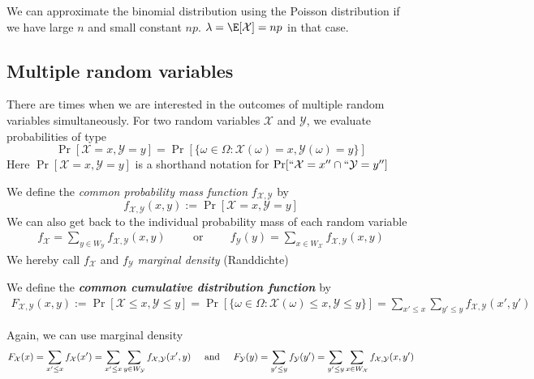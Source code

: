 We can approximate the binomial distribution using the Poisson distribution if we have large $n$ and small constant $np$. $\lambda = \E[\mathcal{X}] = np$ in that case.



\newpage
\subsection{Multiple random variables}
There are times when we are interested in the outcomes of multiple random variables simultaneously. For two random variables $\mathcal{X}$ and $\mathcal{Y}$, we evaluate probabilities of type
\[
    \Pr[\mathcal{X} = x, \mathcal{Y} = y] = \Pr[\{ \omega \in \Omega : \mathcal{X}(\omega) = x, \mathcal{Y}(\omega) = y \}]
\]
Here $\Pr[\mathcal{X} = x, \mathcal{Y} = y]$ is a shorthand notation for $\Pr[``\mathcal{X} = x'' \cap ``\mathcal{Y} = y'']$

We define the \textit{common probability mass function} $f_{\mathcal{X}, \mathcal{Y}}$ by
\[
    f_{\mathcal{X}, \mathcal{Y}}(x, y) := \Pr[\mathcal{X} = x, \mathcal{Y} = y]
\]
We can also get back to the individual probability mass of each random variable
\begin{align*}
    f_{\mathcal{X}} = \sum_{y \in W_{\mathcal{Y}}} f_{\mathcal{X}, \mathcal{Y}}(x, y) \hspace{1cm} \text{or} \hspace{1cm} f_{\mathcal{Y}}(y) = \sum_{x \in W_{\mathcal{X}}} f_{\mathcal{X}, \mathcal{Y}}(x, y)
\end{align*}
We hereby call $f_{\mathcal{X}}$ and $f_{\mathcal{Y}}$ \textit{marginal density} (Randdichte)

We define the \textbf{\textit{common cumulative distribution function}} by
\begin{align*}
    F_{\mathcal{X}, \mathcal{Y}}(x, y) := \Pr[\mathcal{X} \leq x, \mathcal{Y} \leq y] = \Pr[\{ \omega \in \Omega : \mathcal{X}(\omega) \leq x, \mathcal{Y} \leq y \}] = \sum_{x' \leq x} \sum_{y' \leq y} f_{\mathcal{X}, \mathcal{Y}}(x', y')
\end{align*}

Again, we can use marginal density
\begin{align*}
    F_{\mathcal{X}}(x) = \sum_{x'\leq x} f_{\mathcal{X}}(x') = \sum_{x' \leq x} \sum_{y \in W_{\mathcal{Y}}} f_{\mathcal{X}, \mathcal{Y}}(x', y)
    \hspace{5mm} \text{and} \hspace{5mm}
    F_{\mathcal{Y}}(y) = \sum_{y'\leq y} f_{\mathcal{Y}}(y') = \sum_{y' \leq y} \sum_{x \in W_{\mathcal{X}}} f_{\mathcal{X}, \mathcal{Y}}(x, y')
\end{align*}


